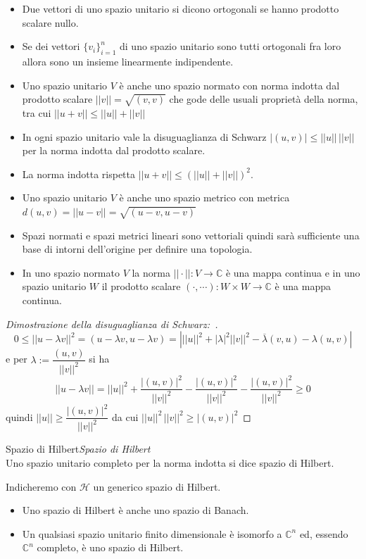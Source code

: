 \documentclass[11pt,a4paper,twoside]{book}
\newenvironment{definizione}[1][\empty]{\begin{Definizione}{
\ifx\empty#1\relax\else\mdseries\itshape#1\\\fi
}{}}{\end{Definizione}}
\newenvironment{dimo}[1][\proofname]{
	\begin{tcolorbox}[
	breakable, 
	enhanced, 
	interior hidden, 
	frame hidden, 
	borderline west = {1pt}{0pt}{gray}, 
	top=0pt, bottom=0pt, left=0pt]
\begin{proof}[#1:~]
}
{
\end{proof}
\end{tcolorbox}
}
\theoremstyle{esss}
\theoremstyle{dotless}
\numberwithin{equation}{section} %
\begin{document}
\begin{itemize}[label=$\cdot$]
\item Due vettori di uno spazio unitario si dicono ortogonali se hanno prodotto scalare nullo.
\item Se dei vettori $\{v_i\}_{i=1}^n$ di uno spazio unitario sono tutti ortogonali fra loro allora sono un insieme linearmente indipendente.
\item Uno spazio unitario $V$ è anche uno spazio normato con norma indotta dal prodotto scalare $||v||=\sqrt{(v,v)}$ che gode delle usuali proprietà della norma, tra cui $||u+v||\leq ||u||+||v||$
\item In ogni spazio unitario vale la disuguaglianza di Schwarz $|(u,v)|\leq ||u||\, ||v||$ per la norma indotta dal prodotto scalare.
\item La norma indotta rispetta $||u+v||\leq (||u||+||v||)^2$.
\item Uno spazio unitario $V$ è anche uno spazio metrico con metrica $d(u,v)=||u-v||=\sqrt{(u-v,u-v)}$
\item Spazi normati e spazi metrici lineari sono vettoriali quindi sarà sufficiente una base di intorni dell'origine per definire una topologia.
\item In uno spazio normato $V$ la norma $||\cdot||:V\rightarrow\mathbb{C}$ è una mappa continua e in uno spazio unitario $W$ il prodotto scalare $(\cdot,\cdots):W\times W\rightarrow\mathbb{C}$ è una mappa continua.
\end{itemize}

\begin{dimo}[Dimostrazione della disuguaglianza di Schwarz]
\[
0\leq||u-\lambda v||^2=(u-\lambda v,u-\lambda v)=\left| ||u||^2 +|\lambda|^2||v||^2 -\overline{\lambda}(v,u) -\lambda(u,v)  \right|
\] 
e per $\lambda:=\dfrac{(u,v)}{||v||^2}$ si ha 
\[
||u-\lambda v||=||u||^2 + \dfrac{|(u,v)|^2}{||v||^2}-\dfrac{|(u,v)|^2}{||v||^2}-\dfrac{|(u,v)|^2}{||v||^2}\geq 0
\]
quindi $||u||\geq\dfrac{|(u,v)|^2}{||v||^2}$ da cui $||u||^2 \, ||v||^2 \geq |(u,v)|^2$ \qedhere
\end{dimo}


\begin{definizione}[Spazio di Hilbert]
Uno spazio unitario completo per la norma indotta si dice spazio di Hilbert. 

Indicheremo con $\mathcal{H}$ un generico spazio di Hilbert.
\end{definizione}

\begin{itemize}[label=$\cdot$]
\item Uno spazio di Hilbert è anche uno spazio di Banach.
\item Un qualsiasi spazio unitario finito dimensionale è isomorfo a $\mathbb{C}^n$ ed, essendo $\mathbb{C}^n$ completo, è uno spazio di Hilbert.
\end{itemize}
\end{document}
